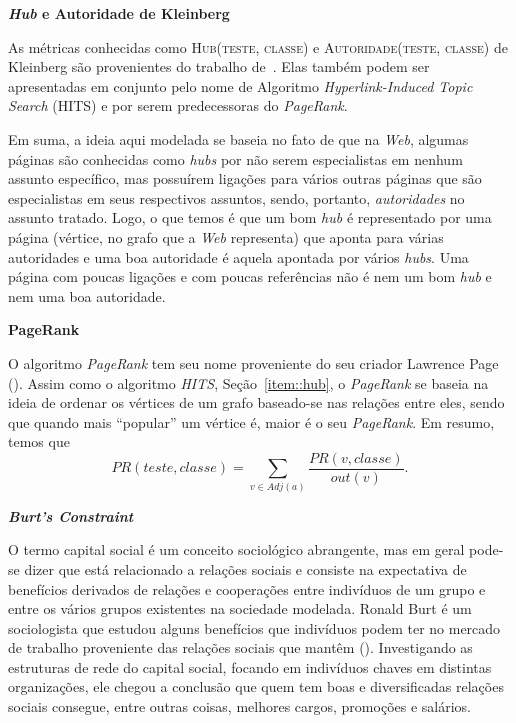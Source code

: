 \begin{description}
\item{\textbf{\textit{Hub} e Autoridade de Kleinberg}}
\label{item::hub}

As métricas conhecidas como \textsc{Hub(teste, classe)} e \textsc{Autoridade(teste, classe)} de Kleinberg são provenientes do trabalho de~\cite{Kleinberg99}. Elas também podem ser apresentadas em conjunto pelo nome de Algoritmo \textit{Hyperlink-Induced Topic Search} (HITS) e por serem predecessoras do \textit{PageRank}.

Em suma, a ideia aqui modelada se baseia no fato de que na \textit{Web}, algumas páginas são conhecidas como \textit{hubs} por não serem especialistas em nenhum assunto específico, mas possuírem ligações para vários outras páginas que são especialistas em seus respectivos assuntos, sendo, portanto, \textit{autoridades} no assunto tratado. Logo, o que temos é que um bom \textit{hub} é representado por uma página (vértice, no grafo que a \textit{Web} representa) que aponta para várias autoridades e uma boa autoridade é aquela apontada por vários \textit{hubs}. Uma página com poucas ligações e com poucas referências não é nem um bom \textit{hub} e nem uma boa autoridade.

\item{\textbf{PageRank}}
\label{item::pagerank}

O algoritmo \textit{PageRank} tem seu nome proveniente do seu criador Lawrence Page (\cite{Page98}). Assim como o algoritmo \textit{HITS}, Seção~\ref{item::hub}, o \textit{PageRank} se baseia na ideia de ordenar os vértices de um grafo baseado-se nas relações entre eles, sendo que quando mais ``popular'' um vértice é, maior é o seu \textit{PageRank}. Em resumo, temos que
\begin{equation}\label{eqn::pagerank}
PR(teste, classe) = \sum_{v \in Adj(a)} \frac{PR(v, classe)}{out(v)}.
\end{equation}

\item{\textbf{\textit{Burt's Constraint}}}
\label{item::constraint}

O termo capital social é um conceito sociológico abrangente, mas em geral pode-se dizer que está relacionado a relações sociais e consiste na expectativa de benefícios derivados de relações e cooperações entre indivíduos de um grupo e entre os vários grupos existentes na sociedade modelada. Ronald Burt é um sociologista que estudou alguns benefícios que indivíduos podem ter no mercado de trabalho proveniente das relações sociais que mantêm (\cite{Burt92}). Investigando as estruturas de rede do capital social, focando em indivíduos chaves em distintas organizações, ele chegou a conclusão que quem tem boas e diversificadas relações sociais consegue, entre outras coisas, melhores cargos, promoções e salários.


\end{description}
